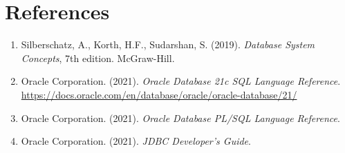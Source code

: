 \documentclass[12pt, a4paper]{article}
\begin{document}
\section*{References}


\begin{enumerate}
    \item Silberschatz, A., Korth, H.F., Sudarshan, S. (2019). \textit{Database System
          Concepts}, 7th edition. McGraw-Hill.
    \item Oracle Corporation. (2021). \textit{Oracle Database 21c SQL Language Reference}.
          \url{https://docs.oracle.com/en/database/oracle/oracle-database/21/}
    \item Oracle Corporation. (2021). \textit{Oracle Database PL/SQL Language Reference}.
    \item Oracle Corporation. (2021). \textit{JDBC Developer's Guide}.
\end{enumerate}
\end{document}
